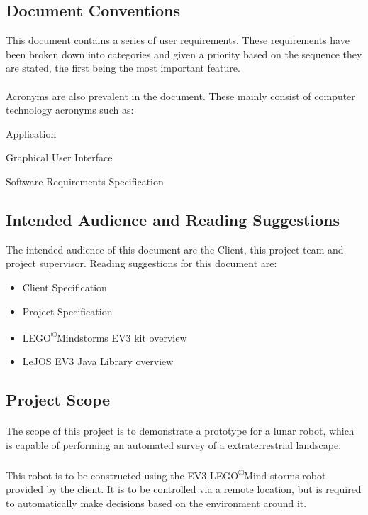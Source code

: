 \documentclass[10pt,a4paper,titlepage]{article}
\newcommand{\cpright}{\textsuperscript{\tiny\copyright}}
\begin{document}
	\subsection{Document Conventions}
	This document contains a series of user requirements. These requirements have been broken down into categories and given a priority based on the sequence they are stated, the first being the most important feature.
	\paragraph{}
	Acronyms are also prevalent in the document. These mainly consist of computer technology acronyms such as:
	\begin{description}[align=right,labelwidth=3cm]
		\item [App] Application
		\item [GUI] Graphical User Interface
		\item [SRS] Software Requirements Specification 
		\item [....]
	\end{description}
	
	\subsection{Intended Audience and Reading Suggestions}
	The intended audience of this document are the Client, this project team and project supervisor. Reading suggestions for this document are:
	\begin{itemize}
		\item Client Specification
		\item Project Specification
		\item LEGO\cpright Mindstorms EV3 kit overview
		\item LeJOS EV3 Java Library overview
	\end{itemize}
	
	\subsection{Project Scope}
	\paragraph{}
	The scope of this project is to demonstrate a prototype for a lunar robot, which is capable of performing an automated survey of a extraterrestrial landscape.
	\paragraph{}
	This robot is to be constructed using the EV3 LEGO\cpright Mind-storms robot provided by the client. It is to be controlled via a remote location, but is required to automatically make decisions based on the environment around it.
	
\end{document}
